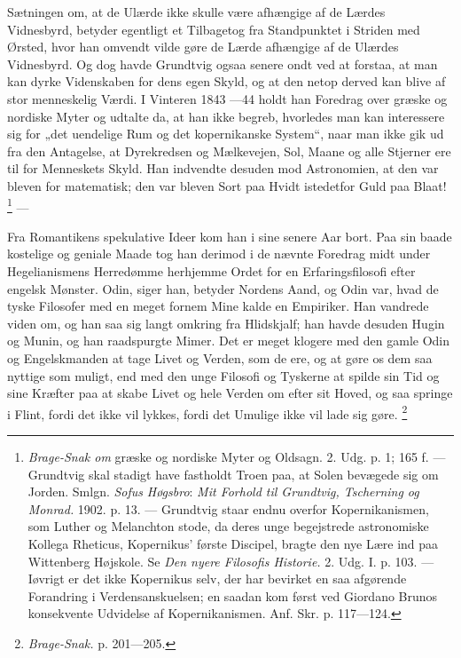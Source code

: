 \documentclass[12pt,a4paper,openany]{book}
\newcommand{\opage}[1]{\marginnote{\footnotesize\textit{[#1]}}}
\begin{document}
Sætningen om, at de Ulærde ikke skulle være afhængige af de Lærdes Vidnesbyrd,
betyder egentligt et Tilbagetog fra Standpunktet i Striden med Ørsted, hvor han
omvendt vilde gøre de Lærde afhængige af de Ulærdes Vidnesbyrd. Og dog havde
Grundtvig ogsaa senere ondt ved at forstaa, at man kan dyrke Videnskaben for
dens egen Skyld, og at den netop derved kan blive af stor menneskelig Værdi. I
Vinteren 1843 ---44 holdt han Foredrag over græske og nordiske Myter og udtalte
da, at han ikke begreb, hvorledes man kan interessere sig for „det uendelige
Rum og det kopernikanske System“, naar man ikke gik ud fra den Antagelse, at
Dyrekredsen og Mælkevejen, Sol, Maane og alle Stjerner ere til for Menneskets
Skyld. Han indvendte desuden mod Astronomien, at den var bleven for matematisk;
den var bleven Sort paa Hvidt istedetfor Guld paa Blaat!%
\footnote[1]{\textit{Brage-Snak om} græske og nordiske Myter og Oldsagn. 2.
Udg. p. 1; 165 f. --- Grundtvig skal stadigt have fastholdt Troen paa, at Solen
bevægede sig om Jorden. Smlgn. \emph{Sofus} \emph{Høgsbro}: \textit{Mit Forhold
til Grundtvig, Tscherning og Monrad.} 1902. p. 13. --- Grundtvig staar endnu
overfor Kopernikanismen, som Luther og Melanchton stode, da deres unge
begejstrede astronomiske Kollega Rheticus, Kopernikus' første Discipel, bragte
den nye Lære ind paa Wittenberg Højskole. Se \textit{Den nyere Filosofis
Historie.} 2. Udg. I. p. 103. --- Iøvrigt er det ikke Kopernikus selv, der har
bevirket en saa afgørende Forandring i Verdensanskuelsen; en saadan kom først
ved Giordano Brunos konsekvente Udvidelse af Kopernikanismen. Anf. Skr. p.
117---124.} ---

Fra Romantikens spekulative Ideer kom han i sine senere Aar bort. Paa sin baade
kostelige og geniale Maade tog han derimod i de nævnte Foredrag midt under
Hegelianismens Herredømme herhjemme Ordet for en Erfaringsfilosofi efter
engelsk Mønster. Odin, siger han, betyder Nordens Aand, og
\setcounter{footnote}{0}%
\opage{65}Odin var, hvad de tyske Filosofer med en meget fornem Mine kalde en
Empiriker. Han vandrede viden om, og han saa sig langt omkring fra Hlidskjalf;
han havde desuden Hugin og Munin, og han raadspurgte Mimer. Det er meget
klogere med den gamle Odin og Engelskmanden at tage Livet og Verden, som de
ere, og at gøre os dem saa nyttige som muligt, end med den unge Filosofi og
Tyskerne at spilde sin Tid og sine Kræfter paa at skabe Livet og hele Verden om
efter sit Hoved, og saa springe i Flint, fordi det ikke vil lykkes, fordi det
Umulige ikke vil lade sig gøre.%
\footnote[1]{\textit{Brage-Snak.} p. 201---205.}
\end{document}
